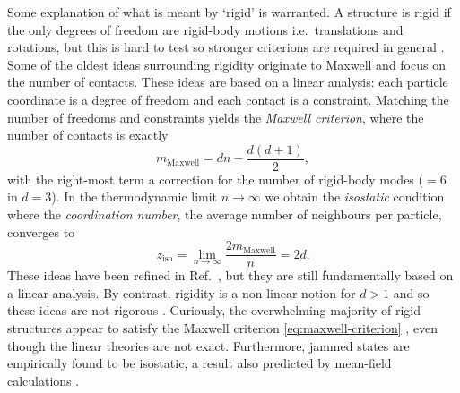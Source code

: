 \documentclass[11pt,twoside]{report}
\begin{document}
Some explanation of what is meant by `rigid' is warranted.
A structure is rigid if the only degrees of freedom are rigid-body motions i.e.\ translations and rotations, but this is hard to test so stronger criterions are required in general \cite{ConnellySJDM1996,Holmes-CerfonSR2016,Holmes-CerfonARCMP2017}.
Some of the oldest ideas surrounding rigidity originate to Maxwell \cite{MaxwellRigidity1864} and focus on the number of contacts.
These ideas are based on a linear analysis: each particle coordinate is a degree of freedom and each contact is a constraint.
Matching the number of freedoms and constraints yields the \emph{Maxwell criterion}, where the number of contacts is exactly \cite{MaxwellRigidity1864}
\begin{equation}\label{eq:maxwell-criterion}
  m_\mathrm{Maxwell} = dn - \frac{d(d+1)}{2},
\end{equation}
with the right-most term a correction for the number of rigid-body modes ($=6$ in $d=3$).
In the thermodynamic limit $n \to \infty$ we obtain the \emph{isostatic} condition where the \emph{coordination number}, the average number of neighbours per particle, converges to
\begin{equation*}
  z_\mathrm{iso}
  =
  \lim_{n \to \infty} \frac{2m_\mathrm{Maxwell}}{n}
  = 2d.
\end{equation*}
These ideas have been refined in Ref.\ \cite{CalladineIJSS1978}, but they are still fundamentally based on a linear analysis.
By contrast, rigidity is a non-linear notion for $d > 1$ and so these ideas are not rigorous%
.
Curiously, the overwhelming majority of rigid structures appear to satisfy the Maxwell criterion \eqref{eq:maxwell-criterion} \cite{Holmes-CerfonSR2016,Holmes-CerfonARCMP2017}, even though the linear theories are not exact.
Furthermore, jammed states are empirically found to be isostatic, a result also predicted by mean-field calculations \cite{CharbonneauJSM2014,CharbonneauNC2014}.
\end{document}
